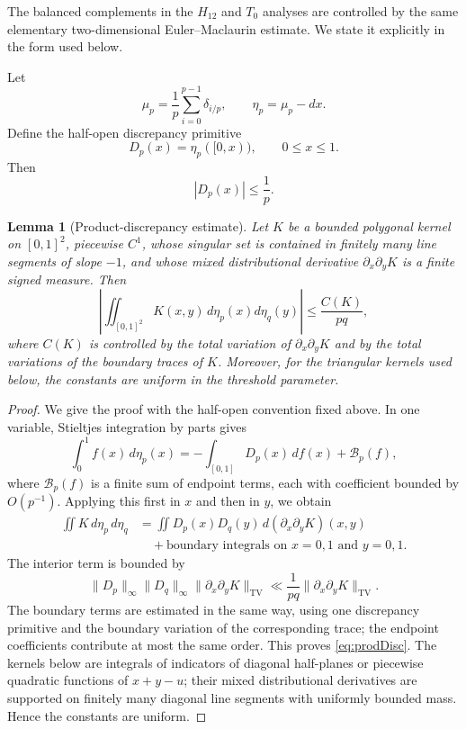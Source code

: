 \documentclass[a4paper,american,11pt]{amsart}
\theoremstyle{plain}
\newtheorem{lemma}[theorem]{Lemma}
\theoremstyle{definition}
\DeclareMathOperator{\TV}{TV}
\begin{document}
The balanced complements in the \(H_{12}\) and \(T_0\) analyses are controlled
by the same elementary two-dimensional Euler--Maclaurin estimate.  We state it
explicitly in the form used below.

Let
\[
 \mu_p=\frac1p\sum_{i=0}^{p-1}\delta_{i/p},
 \qquad
 \eta_p=\mu_p-dx.
\]
Define the half-open discrepancy primitive
\[
 D_p(x)=\eta_p([0,x)),
 \qquad 0\le x\le1.
\]
Then
\begin{equation}\label{eq:DpBound}
 |D_p(x)|\le \frac1p.
\end{equation}

\begin{lemma}[Product-discrepancy estimate]\label{lem:prodDisc}
Let \(K\) be a bounded polygonal kernel on \([0,1]^2\), piecewise \(C^1\),
whose singular set is contained in finitely many line segments of slope
\(-1\), and whose mixed distributional derivative \(\partial_x\partial_yK\)
is a finite signed measure.  Then
\begin{equation}\label{eq:prodDisc}
 \left|\iint_{[0,1]^2}K(x,y)\,d\eta_p(x)d\eta_q(y)\right|
 \le
 \frac{C(K)}{pq},
\end{equation}
where \(C(K)\) is controlled by the total variation of
\(\partial_x\partial_yK\) and by the total variations of the boundary traces
of \(K\).  Moreover, for the triangular kernels used below, the constants are
uniform in the threshold parameter.
\end{lemma}

\begin{proof}
We give the proof with the half-open convention fixed above.  In one variable,
Stieltjes integration by parts gives
\[
 \int_0^1 f(x)\,d\eta_p(x)
 =-\int_{[0,1]}D_p(x)\,df(x)+\mathcal B_p(f),
\]
where \(\mathcal B_p(f)\) is a finite sum of endpoint terms, each with
coefficient bounded by \(O(p^{-1})\).  Applying this first in \(x\) and then
in \(y\), we obtain
\begin{align*}
 \iint K\,d\eta_p\,d\eta_q
 &=\iint D_p(x)D_q(y)\,d(\partial_x\partial_yK)(x,y)\\
 &\quad +\text{boundary integrals on }x=0,1\text{ and }y=0,1.
\end{align*}
The interior term is bounded by
\[
 \|D_p\|_\infty\|D_q\|_\infty\|\partial_x\partial_yK\|_{\TV}
 \ll \frac1{pq}\|\partial_x\partial_yK\|_{\TV}.
\]
The boundary terms are estimated in the same way, using one discrepancy
primitive and the boundary variation of the corresponding trace; the endpoint
coefficients contribute at most the same order.  This proves
\eqref{eq:prodDisc}.  The kernels below are integrals of indicators of
diagonal half-planes or piecewise quadratic functions of \(x+y-u\); their
mixed distributional derivatives are supported on finitely many diagonal line
segments with uniformly bounded mass.  Hence the constants are uniform.
\end{proof}
\end{document}
